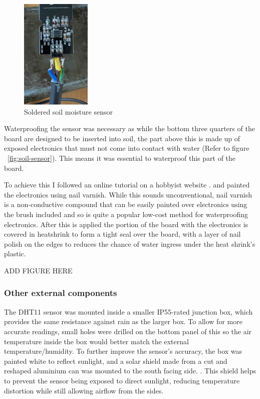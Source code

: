 \begin{figure}[H]
    \centering
    \includegraphics[width=0.3\textwidth]{contents/part-2/fig2/solder-soil.jpeg}
    \caption{Soldered soil moisture sensor}
    \label{fig:solder-soil}
\end{figure}

Waterproofing the sensor was necessary as while the bottom three quarters of the
board are designed to be inserted into soil, the part above this is made up of
exposed electronics that must not come into contact with water (Refer to figure
~\ref{fig:soil-sensor}). This means it was essential to waterproof this part of
the board.

To achieve this I followed an online tutorial on a hobbyist website
\cite{waterproof-sensor}. and painted the electronics using nail varnish. While
this sounds unconventional, nail varnish is a non-conductive compound that can
be easily painted over electronics using the brush included and so is quite a
popular low-cost method for waterproofing electronics. After this is applied the
portion of the board with the electronics is covered in heatshrink to form a
tight seal over the board, with a layer of nail polish on the edges to reduces
the chance of water ingress under the heat shrink's plastic.

ADD FIGURE HERE

\subsubsection{Other external components}

The DHT11 sensor was mounted inside a smaller IP55-rated junction box, which
provides the same resistance against rain as the larger box. To allow for more
accurate readings, small holes were drilled on the bottom panel of this so the
air temperature inside the box would better match the external
temperature/humidity. To further improve the sensor's accuracy, the box was
painted white to reflect sunlight, and a solar shield made from a cut and
reshaped aluminium can was mounted to the south facing side. . This shield helps
to prevent the sensor being exposed to direct sunlight, reducing temperature
distortion while still allowing airflow from the sides.

